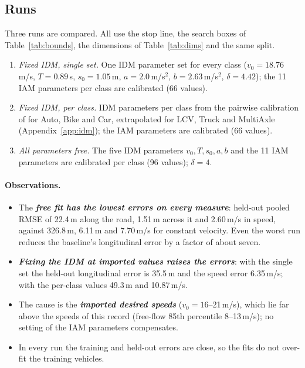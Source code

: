 \documentclass[11pt]{article}
\newcommand{\key}[1]{\textbf{\textit{#1}}}
\begin{document}
\subsection{Runs}
Three runs are compared. All use the stop line, the search boxes of
Table~\ref{tab:bounds}, the dimensions of Table~\ref{tab:dims} and the same
split.
\begin{enumerate}\setlength{\itemsep}{1pt}
\item \emph{Fixed IDM, single set.} One IDM parameter set for every class
\cite{chandra} ($v_0=18.76$\,m/s, $T=0.89$\,s, $s_0=1.05$\,m, $a=2.0$\,m/s$^2$,
$b=2.63$\,m/s$^2$, $\delta=4.42$); the 11 IAM parameters per class are
calibrated (66 values).
\item \emph{Fixed IDM, per class.} IDM parameters per class from the pairwise
calibration of \cite[slide~10]{duggal} for Auto, Bike and Car, extrapolated for LCV,
Truck and MultiAxle (Appendix~\ref{app:idm}); the IAM parameters are calibrated
(66 values).
\item \emph{All parameters free.} The five IDM parameters $v_0,T,s_0,a,b$ and
the 11 IAM parameters are calibrated per class (96 values); $\delta=4$.
\end{enumerate}

\begin{table}[H]\centering\footnotesize
\caption{Mean $F$ and pooled RMSE~\eqref{eq:pooled} of position along the
road (long.), position across it (lat.) and speed, for the three runs and for
a constant-velocity baseline, in which each vehicle keeps its measured entry
speed, along and across the road, for its whole time on the section; the
baseline is scored on the same vehicles and frames. Per-class values are in
Appendix~\ref{app:cls}.}
\label{tab:runs}

\end{table}

\paragraph{Observations.}
\begin{itemize}\setlength{\itemsep}{1pt}
\item The \key{free fit has the lowest errors on every measure}: held-out pooled
RMSE of 22.4\,m along the road, 1.51\,m across it and 2.60\,m/s in speed,
against 326.8\,m, 6.11\,m and 7.70\,m/s for constant velocity. Even the worst
run reduces the baseline's longitudinal error by a factor of about seven.
\item \key{Fixing the IDM at imported values raises the errors}: with the single
set the held-out longitudinal error is 35.5\,m and the speed error 6.35\,m/s;
with the per-class values 49.3\,m and 10.87\,m/s.
\item The cause is the \key{imported desired speeds} ($v_0=16$--21\,m/s), which
lie far above the speeds of this record (free-flow 85th percentile
8--13\,m/s); no setting of the IAM parameters compensates.
\item In every run the training and held-out errors are close, so the fits
do not over-fit the training vehicles.
\end{itemize}
\end{document}
